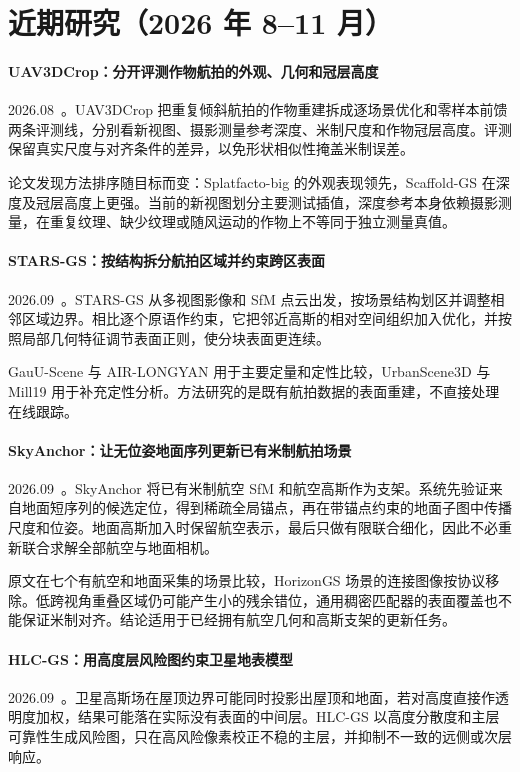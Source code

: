 \section{近期研究（2026 年 8--11 月）}
\paragraph{UAV3DCrop：分开评测作物航拍的外观、几何和冠层高度}
2026.08~\cite{2608_06404}。UAV3DCrop 把重复倾斜航拍的作物重建拆成逐场景优化和零样本前馈两条评测线，分别看新视图、摄影测量参考深度、米制尺度和作物冠层高度。评测保留真实尺度与对齐条件的差异，以免形状相似性掩盖米制误差。

论文发现方法排序随目标而变：Splatfacto-big 的外观表现领先，Scaffold-GS 在深度及冠层高度上更强。当前的新视图划分主要测试插值，深度参考本身依赖摄影测量，在重复纹理、缺少纹理或随风运动的作物上不等同于独立测量真值。

\paragraph{STARS-GS：按结构拆分航拍区域并约束跨区表面}
2026.09~\cite{2609_03447}。STARS-GS 从多视图影像和 SfM 点云出发，按场景结构划区并调整相邻区域边界。相比逐个原语作约束，它把邻近高斯的相对空间组织加入优化，并按照局部几何特征调节表面正则，使分块表面更连续。

GauU-Scene 与 AIR-LONGYAN 用于主要定量和定性比较，UrbanScene3D 与 Mill19 用于补充定性分析。方法研究的是既有航拍数据的表面重建，不直接处理在线跟踪。

\paragraph{SkyAnchor：让无位姿地面序列更新已有米制航拍场景}
2026.09~\cite{2609_13903}。SkyAnchor 将已有米制航空 SfM 和航空高斯作为支架。系统先验证来自地面短序列的候选定位，得到稀疏全局锚点，再在带锚点约束的地面子图中传播尺度和位姿。地面高斯加入时保留航空表示，最后只做有限联合细化，因此不必重新联合求解全部航空与地面相机。

原文在七个有航空和地面采集的场景比较，HorizonGS 场景的连接图像按协议移除。低跨视角重叠区域仍可能产生小的残余错位，通用稠密匹配器的表面覆盖也不能保证米制对齐。结论适用于已经拥有航空几何和高斯支架的更新任务。

\paragraph{HLC-GS：用高度层风险图约束卫星地表模型}
2026.09~\cite{2609_16772}。卫星高斯场在屋顶边界可能同时投影出屋顶和地面，若对高度直接作透明度加权，结果可能落在实际没有表面的中间层。HLC-GS 以高度分散度和主层可靠性生成风险图，只在高风险像素校正不稳的主层，并抑制不一致的远侧或次层响应。

